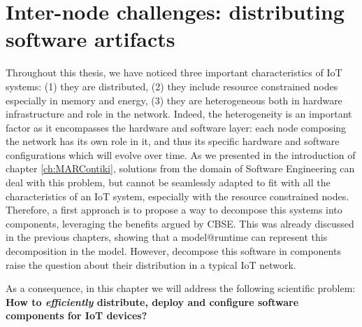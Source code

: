 \chapter{Inter-node challenges: distributing software artifacts}
\label{ch:softArtDist}
Throughout this thesis, we have noticed three important characteristics of IoT systems: (1) they are distributed, (2) they include resource constrained nodes especially in memory and energy, (3) they are heterogeneous both in hardware infrastructure and role in the network. 
Indeed, the heterogeneity is an important factor as it encompasses the hardware and software layer: each node composing the network has its own role in it, and thus its specific hardware and software configurations which will evolve over time.
As we presented in the introduction of chapter \ref{ch:MARContiki}, solutions from the domain of Software Engineering can deal with this problem, but cannot be seamlessly adapted to fit with all the characteristics of an IoT system, especially with the resource constrained nodes.
Therefore, a first approach is to propose a way to decompose this systems into components, leveraging the benefits argued by CBSE. This was already discussed in the previous chapters, showing that a model@runtime can represent this decomposition in the model.
However, decompose this software in components raise the question about their distribution in a typical IoT network.

As a consequence, in this chapter we will address the following scientific problem: \textbf{How to \textit{efficiently} distribute, deploy and configure software components for IoT devices?}

